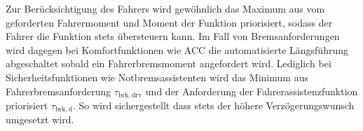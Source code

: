 Zur Berücksichtigung des Fahrers wird gewöhnlich das Maximum aus vom geforderten Fahrermoment und Moment der Funktion priorisiert,  sodass der Fahrer die Funktion stets übersteuern kann.  Im Fall von Bremsanforderungen wird dagegen bei Komfortfunktionen wie ACC die automatisierte Längsführung abgeschaltet sobald ein Fahrerbremsmoment angefordert wird. Lediglich bei Sicherheitsfunktionen wie Notbremsassistenten wird das Minimum aus Fahrerbremsanforderung $\tau_\mathrm{brk,drv}$ und der Anforderung der Fahrerassistenzfunktion priorisiert $\tau_\mathrm{brk,d}$. So wird sichergestellt dass stets der höhere Verzögerungswunsch umgesetzt wird.

\FloatBarrier
